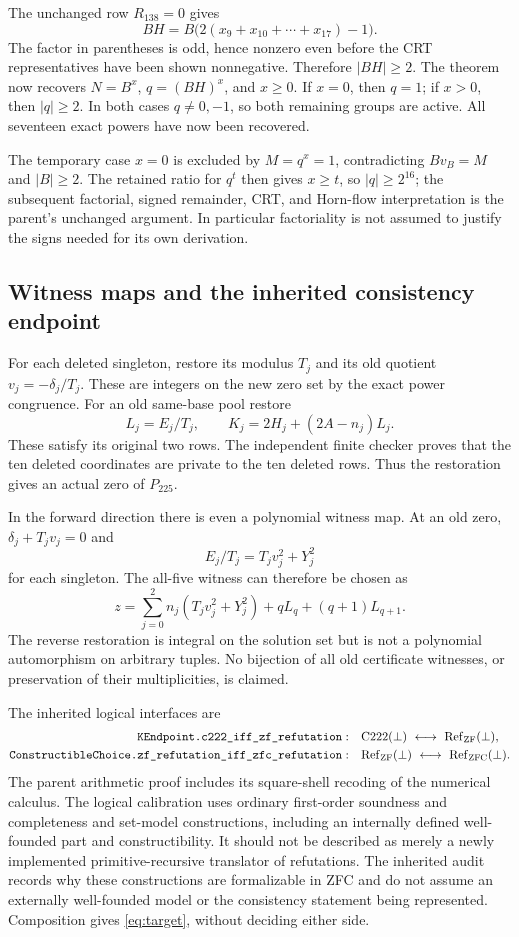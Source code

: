 \documentclass[11pt]{article}
\theoremstyle{definition}\newtheorem{definition}[theorem]{Definition}
\theoremstyle{remark}\newtheorem{remark}[theorem]{Remark}
\newcommand{\src}[1]{\texttt{\detokenize{#1}}}
\begin{document}
The unchanged row $R_{138}=0$ gives
\[
BH=B\bigl(2(x_9+x_{10}+\cdots+x_{17})-1\bigr).
\]
The factor in parentheses is odd, hence nonzero even before the CRT
representatives have been shown nonnegative. Therefore $|BH|\ge2$.
The theorem now recovers $N=B^x$, $q=(BH)^x$, and $x\ge0$.
If $x=0$, then $q=1$; if $x>0$, then $|q|\ge2$. In both cases
$q\ne0,-1$, so both remaining groups are active. All seventeen exact
powers have now been recovered.

The temporary case $x=0$ is excluded by $M=q^x=1$, contradicting
$Bv_B=M$ and $|B|\ge2$. The retained ratio for $q^t$ then gives
$x\ge t$, so $|q|\ge2^{16}$; the subsequent factorial, signed
remainder, CRT, and Horn-flow interpretation is the parent's unchanged
argument. In particular factoriality is not assumed to justify the
signs needed for its own derivation.

\subsection{Witness maps and the inherited consistency endpoint}

For each deleted singleton, restore its modulus $T_j$ and its old quotient
$v_j=-\delta_j/T_j$. These are integers on the new zero set by the exact
power congruence. For an old same-base pool restore
\[
L_j=E_j/T_j,\qquad K_j=2H_j+(2A-n_j)L_j.
\]
These satisfy its original two rows. The independent finite checker proves
that the ten deleted coordinates are private to the ten deleted rows.
Thus the restoration gives an actual zero of $P_{225}$.

In the forward direction there is even a polynomial witness map. At an
old zero, $\delta_j+T_jv_j=0$ and
\[
E_j/T_j=T_jv_j^2+Y_j^2
\]
for each singleton. The all-five witness can therefore be chosen as
\[
z=\sum_{j=0}^{2}n_j(T_jv_j^2+Y_j^2)
+qL_q+(q+1)L_{q+1}.
\]
The reverse restoration is integral on the solution set but is not a
polynomial automorphism on arbitrary tuples. No bijection of all old
certificate witnesses, or preservation of their multiplicities, is claimed.

The inherited logical interfaces are
\begin{align*}
\src{KEndpoint.c222_iff_zf_refutation}:&\quad
\mathrm{C222}(\bot)\ \longleftrightarrow\ \mathrm{Ref}_{\mathrm{ZF}}(\bot),\\
\src{ConstructibleChoice.zf_refutation_iff_zfc_refutation}:&\quad
\mathrm{Ref}_{\mathrm{ZF}}(\bot)\ \longleftrightarrow\ \mathrm{Ref}_{\mathrm{ZFC}}(\bot).
\end{align*}
The parent arithmetic proof includes its square-shell recoding of the
numerical calculus. The logical calibration uses ordinary first-order
soundness and completeness and set-model constructions, including an
internally defined well-founded part and constructibility. It should not
be described as merely a newly implemented primitive-recursive translator
of refutations. The inherited audit records why these constructions are
formalizable in ZFC and do not assume an externally well-founded model
or the consistency statement being represented. Composition gives
\eqref{eq:target}, without deciding either side.
\end{document}

